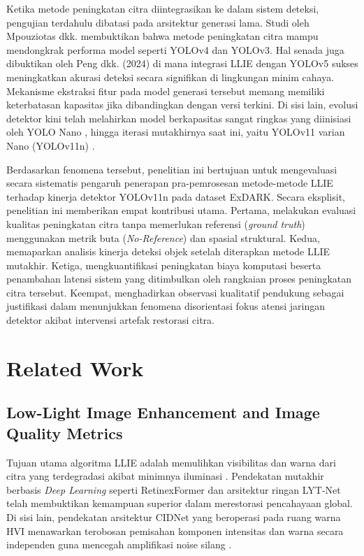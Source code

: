 \documentclass[conference]{IEEEtran}
\begin{document}
Ketika metode peningkatan citra diintegrasikan ke dalam sistem deteksi, pengujian terdahulu dibatasi pada arsitektur generasi lama. Studi oleh Mpouziotas dkk. \cite{mpouziotas2022lowlight} membuktikan bahwa metode peningkatan citra mampu mendongkrak performa model seperti YOLOv4 dan YOLOv3. Hal senada juga dibuktikan oleh Peng dkk. (2024) \cite{peng2024yolov5llie} di mana integrasi LLIE dengan YOLOv5 sukses meningkatkan akurasi deteksi secara signifikan di lingkungan minim cahaya. Mekanisme ekstraksi fitur pada model generasi tersebut memang memiliki keterbatasan kapasitas jika dibandingkan dengan versi terkini. Di sisi lain, evolusi detektor kini telah melahirkan model berkapasitas sangat ringkas yang diinisiasi oleh YOLO Nano \cite{wong2019yolonano}, hingga iterasi mutakhirnya saat ini, yaitu YOLOv11 varian Nano (YOLOv11n) \cite{khanam2024yolov11}.

Berdasarkan fenomena tersebut, penelitian ini bertujuan untuk mengevaluasi secara sistematis pengaruh penerapan pra-pemrosesan metode-metode LLIE terhadap kinerja detektor YOLOv11n pada dataset ExDARK. Secara eksplisit, penelitian ini memberikan empat kontribusi utama. Pertama, melakukan evaluasi kualitas peningkatan citra tanpa memerlukan referensi (\textit{ground truth}) menggunakan metrik buta (\textit{No-Reference}) dan spasial struktural. Kedua, memaparkan analisis kinerja deteksi objek setelah diterapkan metode LLIE mutakhir. Ketiga, mengkuantifikasi peningkatan biaya komputasi beserta penambahan latensi sistem yang ditimbulkan oleh rangkaian proses peningkatan citra tersebut. Keempat, menghadirkan observasi kualitatif pendukung sebagai justifikasi dalam menunjukkan fenomena disorientasi fokus atensi jaringan detektor akibat intervensi artefak restorasi citra.




\section{Related Work} 
\subsection{Low-Light Image Enhancement and Image Quality Metrics} 
Tujuan utama algoritma LLIE adalah memulihkan visibilitas dan warna dari citra yang terdegradasi akibat minimnya iluminasi \cite{liu2021benchmark}. Pendekatan mutakhir berbasis \textit{Deep Learning} seperti RetinexFormer \cite{cai2023retinexformer} dan arsitektur ringan LYT-Net \cite{brateanu2025lytnet} telah membuktikan kemampuan superior dalam merestorasi pencahayaan global. Di sisi lain, pendekatan arsitektur CIDNet yang beroperasi pada ruang warna HVI menawarkan terobosan pemisahan komponen intensitas dan warna secara independen guna mencegah amplifikasi noise silang \cite{yan2025hvi}.
\end{document}
